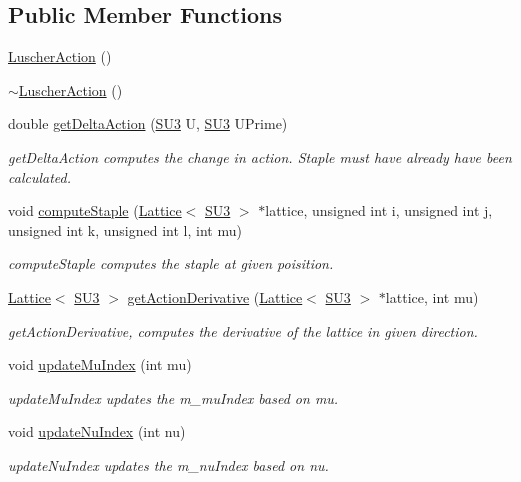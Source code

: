 \subsection*{Public Member Functions}
\begin{DoxyCompactItemize}
\item 
\mbox{\hyperlink{class_luscher_action_a2389aab5b35b4c5ccb0ae5a45f68430b}{Luscher\+Action}} ()
\item 
\mbox{\hyperlink{class_luscher_action_a3b4de167f04479da56fd4aa1e7fe0bbb}{$\sim$\+Luscher\+Action}} ()
\item 
double \mbox{\hyperlink{class_luscher_action_a1955f8eea8b0771f6c737c39e3fc11b2}{get\+Delta\+Action}} (\mbox{\hyperlink{class_s_u3}{S\+U3}} U, \mbox{\hyperlink{class_s_u3}{S\+U3}} U\+Prime)
\begin{DoxyCompactList}\small\item\em get\+Delta\+Action computes the change in action. Staple must have already have been calculated. \end{DoxyCompactList}\item 
void \mbox{\hyperlink{class_luscher_action_a42285b6e3015935588e1fab6b90c1a11}{compute\+Staple}} (\mbox{\hyperlink{class_lattice}{Lattice}}$<$ \mbox{\hyperlink{class_s_u3}{S\+U3}} $>$ $\ast$lattice, unsigned int i, unsigned int j, unsigned int k, unsigned int l, int mu)
\begin{DoxyCompactList}\small\item\em compute\+Staple computes the staple at given poisition. \end{DoxyCompactList}\item 
\mbox{\hyperlink{class_lattice}{Lattice}}$<$ \mbox{\hyperlink{class_s_u3}{S\+U3}} $>$ \mbox{\hyperlink{class_luscher_action_ac11785b2df276816a098a87e6ac514c7}{get\+Action\+Derivative}} (\mbox{\hyperlink{class_lattice}{Lattice}}$<$ \mbox{\hyperlink{class_s_u3}{S\+U3}} $>$ $\ast$lattice, int mu)
\begin{DoxyCompactList}\small\item\em get\+Action\+Derivative, computes the derivative of the lattice in given direction. \end{DoxyCompactList}\item 
void \mbox{\hyperlink{class_luscher_action_a2bfa5f9b8bfb0c4440732000d2281519}{update\+Mu\+Index}} (int mu)
\begin{DoxyCompactList}\small\item\em update\+Mu\+Index updates the m\+\_\+mu\+Index based on mu. \end{DoxyCompactList}\item 
void \mbox{\hyperlink{class_luscher_action_a6496c97ed38401c0d94855bf940fd6ff}{update\+Nu\+Index}} (int nu)
\begin{DoxyCompactList}\small\item\em update\+Nu\+Index updates the m\+\_\+nu\+Index based on nu. \end{DoxyCompactList}\end{DoxyCompactItemize}
